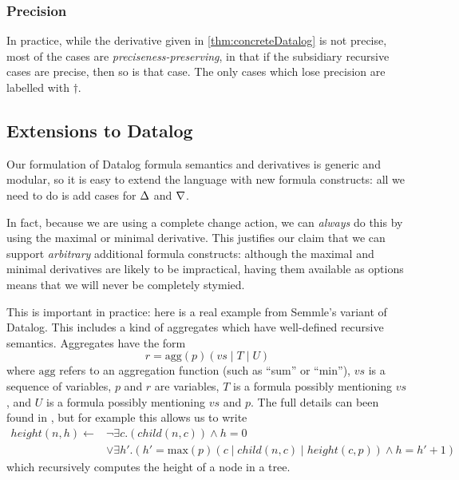 \subsubsection{Precision}

In practice, while the derivative given in \cref{thm:concreteDatalog} is not
precise, most of the cases are \emph{preciseness-preserving}, in that if the
subsidiary recursive cases are precise, then so is that case. The only cases
which lose precision are labelled with $\dagger$.

\subsection{Extensions to Datalog}
\label{sec:extensions}

Our formulation of Datalog formula semantics and derivatives is 
generic and modular, so it is easy to extend the language with new
formula constructs: all we need to do is add cases for $\Delta$ and $\nabla$.

In fact, because we are using a complete change action, we can \emph{always} do this by using the maximal or
minimal derivative. This justifies our claim that we can support
\emph{arbitrary} additional formula constructs: although the maximal and minimal
derivatives are likely to be impractical, having them
available as options means that we will never be completely stymied.

This is important in practice: here is a real example from Semmle's variant of
Datalog. This includes a kind of aggregates which have well-defined recursive
semantics. Aggregates have the form
\begin{displaymath}
  r = \mathrm{agg}(p)(vs \mid T \mid U)
\end{displaymath}
where $\mathrm{agg}$ refers to an aggregation function (such as ``sum'' or
``min''), $vs$ is a sequence of variables, $p$ and $r$ are variables,
$T$ is a formula possibly mentioning $vs$, and $U$ is a formula
possibly mentioning $vs$ and $p$. The full details can been found in
\textcite{demoor2013aggregates}, but for example this allows us to write
\begin{align*}
  height(n, h) \leftarrow& \neg \exists c. (child(n, c)) \wedge h = 0\\
  &\vee \exists h'. (h' = \mathrm{max}(p)(c \mid child(n, c) \mid height(c, p)) \wedge h = h' + 1)
\end{align*}
which recursively computes the height of a node in a tree.

